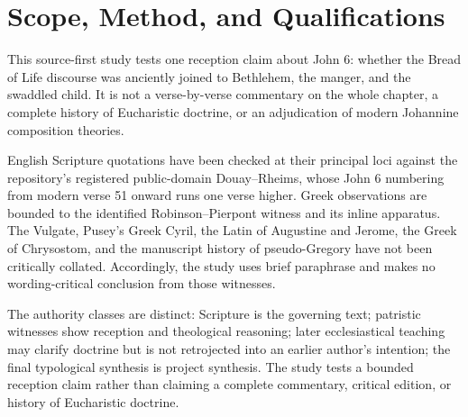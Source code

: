 \section{Scope, Method, and Qualifications}

This source-first study tests one reception claim about John 6: whether the
Bread of Life discourse was anciently joined to Bethlehem, the manger, and the
swaddled child. It is not a verse-by-verse commentary on the whole chapter, a
complete history of Eucharistic doctrine, or an adjudication of modern
Johannine composition theories.

English Scripture quotations have been checked at their principal loci against
the repository's registered public-domain Douay--Rheims, whose John 6 numbering
from modern verse 51 onward runs one verse higher. Greek observations are
bounded to the identified Robinson--Pierpont witness and its inline apparatus.
The Vulgate, Pusey's Greek Cyril, the Latin of Augustine and Jerome, the Greek
of Chrysostom, and the manuscript history of pseudo-Gregory have not been
critically collated. Accordingly, the study uses brief paraphrase and makes no
wording-critical conclusion from those witnesses.

The authority classes are distinct: Scripture is the governing text;
patristic witnesses show reception and theological reasoning; later
ecclesiastical teaching may clarify doctrine but is not retrojected into an
earlier author's intention; the final typological synthesis is project
synthesis. The study tests a bounded reception claim rather than claiming a
complete commentary, critical edition, or history of Eucharistic doctrine.


